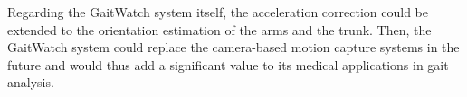 Regarding the GaitWatch system itself, the acceleration correction could be extended to the orientation estimation of the arms and the trunk. Then, the GaitWatch system could replace the camera-based motion capture systems in the future and would thus add a significant value to its medical applications in gait analysis.


